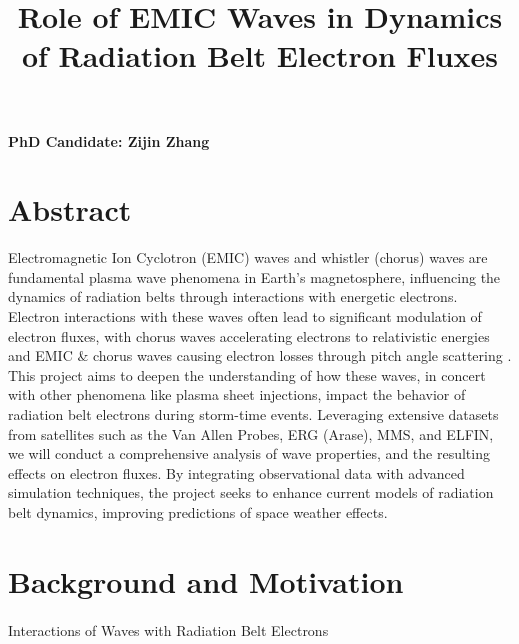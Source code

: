 \documentclass[
  letterpaper,
  DIV=11,
  numbers=noendperiod]{scrartcl}
\title{Role of EMIC Waves in Dynamics of Radiation Belt Electron Fluxes}
\author{}
\date{}
\makeatletter
\let\oldparagraph\paragraph
\renewcommand{\paragraph}{
    \@ifstar
      \xxxParagraphStar
      \xxxParagraphNoStar
  }
\newcommand{\xxxParagraphStar}[1]{\oldparagraph*{#1}\mbox{}}
\newcommand{\xxxParagraphNoStar}[1]{\oldparagraph{#1}\mbox{}}
\makeatother
\begin{document}
\maketitle

\vspace{-20truemm}

\textbf{PhD Candidate: Zijin Zhang}

\section{Abstract}\label{abstract}

Electromagnetic Ion Cyclotron (EMIC) waves and whistler (chorus) waves are fundamental plasma wave phenomena in Earth's magnetosphere, influencing the dynamics of radiation belts through interactions with energetic electrons. Electron interactions with these waves often lead to significant modulation of electron fluxes, with chorus waves accelerating electrons to relativistic energies \citep{miyoshiRebuildingProcessOuter2003} and EMIC \& chorus waves causing electron losses through pitch angle scattering \citep{summersRelativisticElectronPitchangle2003, summersTimescalesRadiationBelt2007}. This project aims to deepen the understanding of how these waves, in concert with other phenomena like plasma sheet injections, impact the behavior of radiation belt electrons during storm-time events. Leveraging extensive datasets from satellites such as the Van Allen Probes, ERG (Arase), MMS, and ELFIN, we will conduct a comprehensive analysis of wave properties, and the resulting effects on electron fluxes. By integrating observational data with advanced simulation techniques, the project seeks to enhance current models of radiation belt dynamics, improving predictions of space weather effects.

\section{Background and Motivation}\label{background-and-motivation}

\paragraph{Interactions of Waves with Radiation Belt Electrons}\label{interactions-of-waves-with-radiation-belt-electrons}
\end{document}
